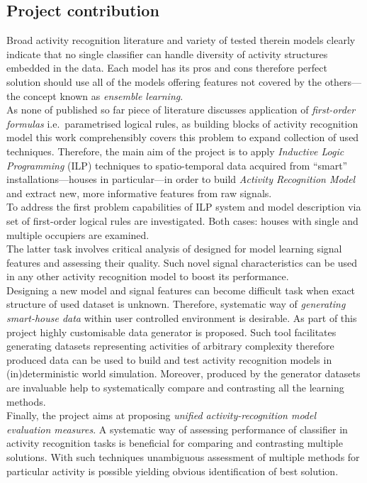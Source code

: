 \documentclass[12pt, a4paper, pdflatex, leqno, twoside, openright]{report}
\begin{document}
    \subsection{Project contribution}
Broad activity recognition literature and variety of tested therein models clearly indicate that no single classifier can handle diversity of activity structures embedded in the data. Each model has its pros and cons therefore perfect solution should use all of the models offering features not covered by the others---the concept known as \emph{ensemble learning}.\\

As none of published so far piece of literature discusses application of \emph{first-order formulas} i.e.\ parametrised logical rules, as building blocks of activity recognition model this work comprehensibly covers this problem to expand collection of used techniques. Therefore, the main aim of the project is to apply \emph{Inductive Logic Programming} (ILP) techniques to spatio-temporal data acquired from ``smart'' installations---houses in particular---in order to build \emph{Activity Recognition Model} and extract new, more informative features from raw signals.\\

To address the first problem capabilities of ILP system and model description via set of first-order logical rules are investigated. Both cases: houses with single and multiple occupiers are examined.\\
The latter task involves critical analysis of designed for model learning signal features and assessing their quality. Such novel signal characteristics can be used in any other activity recognition model to boost its performance.\\

Designing a new model and signal features can become difficult task when exact structure of used dataset is unknown. Therefore, systematic way of \emph{generating smart-house data} within user controlled environment is desirable. As part of this project highly customisable data generator is proposed. Such tool facilitates generating datasets representing activities of arbitrary complexity therefore produced data can be used to build and test activity recognition models in (in)deterministic world simulation. Moreover, produced by the generator datasets are invaluable help to systematically compare and contrasting all the learning methods.\\

Finally, the project aims at proposing \emph{unified activity-recognition model evaluation measures}. A systematic way of assessing performance of classifier in activity recognition tasks is beneficial for comparing and contrasting multiple solutions. With such techniques unambiguous assessment of multiple methods for particular activity is possible yielding obvious identification of best solution.
\end{document}
